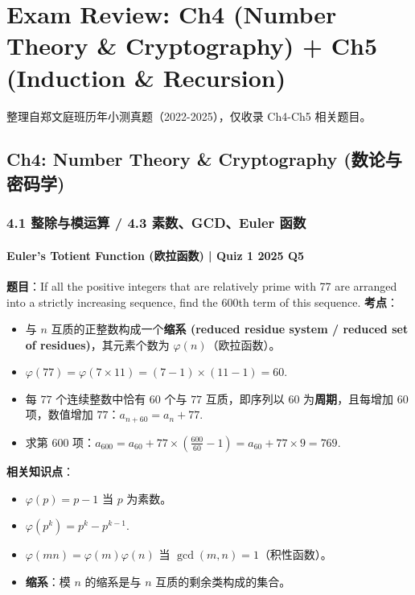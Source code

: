 \documentclass[10pt,a4paper,openany]{ctexbook}
\theoremstyle{definition}
\theoremstyle{remark}
\renewenvironment{quote}
  {\list{}{\leftmargin=1em\rightmargin=0pt\topsep=0.5pt\partopsep=0pt}\item[]}
  {\endlist}
\begin{document}
\newpage

\section{Exam Review: Ch4 (Number Theory \& Cryptography) + Ch5 (Induction \& Recursion)}

\begin{quote}
整理自郑文庭班历年小测真题（2022-2025），仅收录 Ch4-Ch5 相关题目。

\end{quote}
\vspace{-2pt}

\subsection{Ch4: Number Theory \& Cryptography (数论与密码学)}

\subsubsection{4.1 整除与模运算 / 4.3 素数、GCD、Euler 函数}

\paragraph{Euler's Totient Function (欧拉函数) | Quiz 1 2025 Q5}

\textbf{题目}：If all the positive integers that are relatively prime with 77 are arranged into a strictly increasing sequence, find the 600th term of this sequence.
\textbf{考点}：
\begin{itemize}
\item 与 $n$ 互质的正整数构成一个\textbf{缩系 (reduced residue system / reduced set of residues)}，其元素个数为 $\varphi(n)$（欧拉函数）。
\item $\varphi(77) = \varphi(7 \times 11) = (7-1) \times (11-1) = 60$.
\item 每 $77$ 个连续整数中恰有 $60$ 个与 $77$ 互质，即序列以 $60$ 为\textbf{周期}，且每增加 $60$ 项，数值增加 $77$：$a_{n+60} = a_n + 77$.
\item 求第 600 项：$a_{600} = a_{60} + 77 \times \left(\frac{600}{60} - 1\right) = a_{60} + 77 \times 9 = 769$.

\end{itemize}

\textbf{相关知识点}：
\begin{itemize}
\item $\varphi(p) = p-1$ 当 $p$ 为素数。
\item $\varphi(p^k) = p^k - p^{k-1}$.
\item $\varphi(mn) = \varphi(m)\varphi(n)$ 当 $\gcd(m,n)=1$（积性函数）。
\item \textbf{缩系}：模 $n$ 的缩系是与 $n$ 互质的剩余类构成的集合。

\end{itemize}
\end{document}
